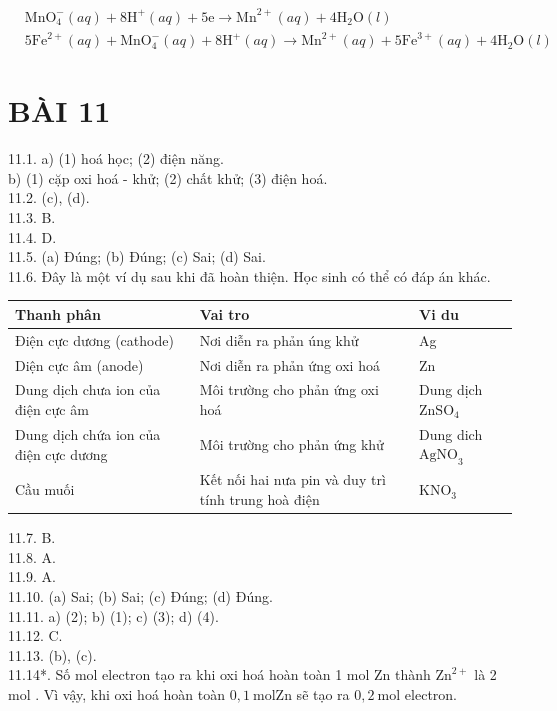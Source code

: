 \documentclass[10pt]{article}
\begin{document}
$$
\begin{aligned}
& \mathrm{MnO}_{4}^{-}(a q)+8 \mathrm{H}^{+}(a q)+5 \mathrm{e} \rightarrow \mathrm{Mn}^{2+}(a q)+4 \mathrm{H}_{2} \mathrm{O}(l) \\
& 5 \mathrm{Fe}^{2+}(a q)+\mathrm{MnO}_{4}^{-}(a q)+8 \mathrm{H}^{+}(a q) \rightarrow \mathrm{Mn}^{2+}(a q)+5 \mathrm{Fe}^{3+}(a q)+4 \mathrm{H}_{2} \mathrm{O}(l)
\end{aligned}
$$

\section*{BÀI 11}
11.1. a) (1) hoá học; (2) điện năng.\\
b) (1) cặp oxi hoá - khử; (2) chất khử; (3) điện hoá.\\
11.2. (c), (d).\\
11.3. B.\\
11.4. D.\\
11.5. (a) Đúng; (b) Đúng; (c) Sai; (d) Sai.\\
11.6. Đây là một ví dụ sau khi đã hoàn thiện. Học sinh có thể có đáp án khác.

\begin{center}
\begin{tabular}{|l|l|l|}
\hline
Thanh phân & Vai tro & Vi du \\
\hline
Điện cực dương (cathode) & Nơi diễn ra phản úng khử & Ag \\
\hline
Diện cực âm (anode) & Nơi diễn ra phản ứng oxi hoá & Zn \\
\hline
Dung dịch chưa ion của điện cực âm & Môi trường cho phản ứng oxi hoá & Dung dịch $\mathrm{ZnSO}_{4}$ \\
\hline
Dung dịch chứa ion của điện cực dương & Môi trường cho phản ứng khử & Dung dich $\mathrm{AgNO}_{3}$ \\
\hline
Cầu muối & Kết nối hai nưa pin và duy trì tính trung hoà điện & $\mathrm{KNO}_{3}$ \\
\hline
\end{tabular}
\end{center}

11.7. B.\\
11.8. A.\\
11.9. A.\\
11.10. (a) Sai; (b) Sai; (c) Đúng; (d) Đúng.\\
11.11. a) (2); b) (1); c) (3); d) (4).\\
11.12. C.\\
11.13. (b), (c).\\
11.14*. Số mol electron tạo ra khi oxi hoá hoàn toàn 1 mol Zn thành $\mathrm{Zn}^{2+}$ là 2 mol . Vì vậy, khi oxi hoá hoàn toàn $0,1 \mathrm{~mol} \mathrm{Zn}$ sẽ tạo ra $0,2 \mathrm{~mol}$ electron.
\end{document}
